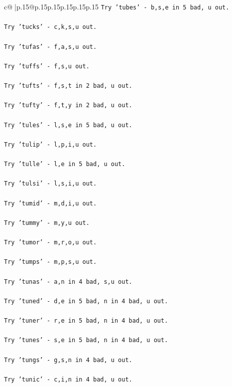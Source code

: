 \documentclass{article}
\begin{document}
{\begin{supertabular}{c@{$\;$}|p{.15\linewidth}@{}p{.15\linewidth}p{.15\linewidth}p{.15\linewidth}p{.15\linewidth}p{.15\linewidth}}
{{{\texttt{Try 'tubes' {-} b,s,e in 5 bad, u out.} \\
\\ 
\texttt{Try 'tucks' {-} c,k,s,u out.} \\
\\ 
\texttt{Try 'tufas' {-} f,a,s,u out.} \\
\\ 
\texttt{Try 'tuffs' {-} f,s,u out.} \\
\\ 
\texttt{Try 'tufts' {-} f,s,t in 2 bad, u out.} \\
\\ 
\texttt{Try 'tufty' {-} f,t,y in 2 bad, u out.} \\
\\ 
\texttt{Try 'tules' {-} l,s,e in 5 bad, u out.} \\
\\ 
\texttt{Try 'tulip' {-} l,p,i,u out.} \\
\\ 
\texttt{Try 'tulle' {-} l,e in 5 bad, u out.} \\
\\ 
\texttt{Try 'tulsi' {-} l,s,i,u out.} \\
\\ 
\texttt{Try 'tumid' {-} m,d,i,u out.} \\
\\ 
\texttt{Try 'tummy' {-} m,y,u out.} \\
\\ 
\texttt{Try 'tumor' {-} m,r,o,u out.} \\
\\ 
\texttt{Try 'tumps' {-} m,p,s,u out.} \\
\\ 
\texttt{Try 'tunas' {-} a,n in 4 bad, s,u out.} \\
\\ 
\texttt{Try 'tuned' {-} d,e in 5 bad, n in 4 bad, u out.} \\
\\ 
\texttt{Try 'tuner' {-} r,e in 5 bad, n in 4 bad, u out.} \\
\\ 
\texttt{Try 'tunes' {-} s,e in 5 bad, n in 4 bad, u out.} \\
\\ 
\texttt{Try 'tungs' {-} g,s,n in 4 bad, u out.} \\
\\ 
\texttt{Try 'tunic' {-} c,i,n in 4 bad, u out.} \\
\\ 
}}}
\end{supertabular}}
\end{document}
